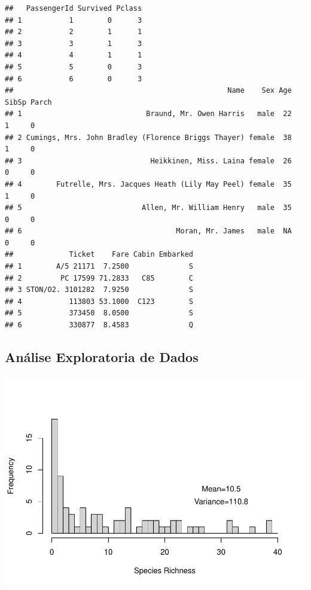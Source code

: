 \documentclass[
]{book}
\newenvironment{Shaded}{\begin{snugshade}}{\end{snugshade}}
\newcommand{\FunctionTok}[1]{\textcolor[rgb]{0.13,0.29,0.53}{\textbf{#1}}}
\newcommand{\NormalTok}[1]{#1}
\newcommand{\SpecialCharTok}[1]{\textcolor[rgb]{0.81,0.36,0.00}{\textbf{#1}}}
\begin{document}
\begin{verbatim}
##   PassengerId Survived Pclass
## 1           1        0      3
## 2           2        1      1
## 3           3        1      3
## 4           4        1      1
## 5           5        0      3
## 6           6        0      3
##                                                  Name    Sex Age SibSp Parch
## 1                             Braund, Mr. Owen Harris   male  22     1     0
## 2 Cumings, Mrs. John Bradley (Florence Briggs Thayer) female  38     1     0
## 3                              Heikkinen, Miss. Laina female  26     0     0
## 4        Futrelle, Mrs. Jacques Heath (Lily May Peel) female  35     1     0
## 5                            Allen, Mr. William Henry   male  35     0     0
## 6                                    Moran, Mr. James   male  NA     0     0
##             Ticket    Fare Cabin Embarked
## 1        A/5 21171  7.2500              S
## 2         PC 17599 71.2833   C85        C
## 3 STON/O2. 3101282  7.9250              S
## 4           113803 53.1000  C123        S
## 5           373450  8.0500              S
## 6           330877  8.4583              Q
\end{verbatim}

\hypertarget{anuxe1lise-exploratoria-de-dados}{%
\subsection{Análise Exploratoria de Dados}\label{anuxe1lise-exploratoria-de-dados}}

\begin{Shaded}
\end{Shaded}

\includegraphics{ECOMODbook_files/figure-latex/unnamed-chunk-26-1.pdf}
\end{document}
